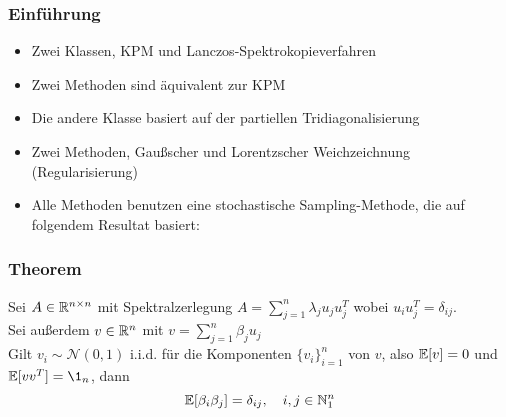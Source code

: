 \begin{frame}
    \frametitle{Einführung}
    \begin{itemize}
        \item Zwei Klassen, KPM und Lanczos-Spektrokopieverfahren
        \item Zwei Methoden sind äquivalent zur KPM
        \item Die andere Klasse basiert auf der partiellen Tridiagonalisierung
        \item Zwei Methoden, Gaußscher und Lorentzscher Weichzeichnung (Regularisierung)
        \item Alle Methoden benutzen eine stochastische Sampling-Methode, die auf folgendem Resultat basiert:
    \end{itemize}
\end{frame}

\begin{frame}
    \frametitle{Theorem}
    Sei $A \in \mathbb{R}^{n \times n}$ mit Spektralzerlegung $A = \sum_{j = 1}^n \lambda_j u_j u_j^T$ wobei $u_iu_j^T = \delta_{ij}$.\\
    Sei außerdem $v \in \mathbb{R}^n$ mit $v = \sum_{j=1}^n \beta_j u_j$\\
    Gilt $v_i \sim \mathcal{N}(0, 1)$ i.i.d. für die Komponenten $\{v_i\}_{i = 1}^n$ von $v$, also $\mathbb{E}[v] = 0$ und $\E[vv^T] = \1_n$, dann
    $$\mathbb{E}[\beta_i \beta_j] = \delta_{ij}, \quad i,j \in \mathbb{N}_1^n$$
\end{frame}
